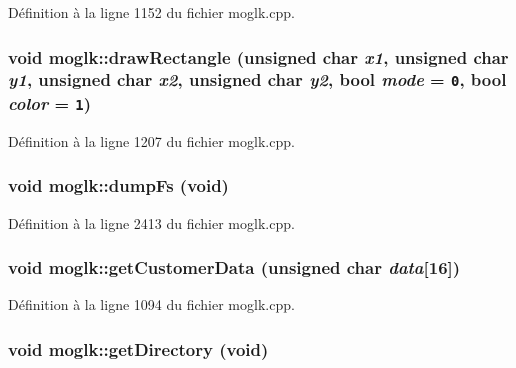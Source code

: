 Définition à la ligne 1152 du fichier moglk.cpp.\hypertarget{classmoglk_df18bd7ec24c35851bc72d6d09a99483}{
\subsubsection[{drawRectangle}]{\setlength{\rightskip}{0pt plus 5cm}void moglk::drawRectangle (unsigned char {\em x1}, \/  unsigned char {\em y1}, \/  unsigned char {\em x2}, \/  unsigned char {\em y2}, \/  bool {\em mode} = {\tt 0}, \/  bool {\em color} = {\tt 1})}}
\label{classmoglk_df18bd7ec24c35851bc72d6d09a99483}




Définition à la ligne 1207 du fichier moglk.cpp.\hypertarget{classmoglk_7f929ca25d08f1c116cd43152b7373f3}{
\subsubsection[{dumpFs}]{\setlength{\rightskip}{0pt plus 5cm}void moglk::dumpFs (void)}}
\label{classmoglk_7f929ca25d08f1c116cd43152b7373f3}




Définition à la ligne 2413 du fichier moglk.cpp.\hypertarget{classmoglk_75192d11f9a4e9abe2ba5b31c41ca772}{
\subsubsection[{getCustomerData}]{\setlength{\rightskip}{0pt plus 5cm}void moglk::getCustomerData (unsigned char {\em data}\mbox{[}16\mbox{]})}}
\label{classmoglk_75192d11f9a4e9abe2ba5b31c41ca772}




Définition à la ligne 1094 du fichier moglk.cpp.\hypertarget{classmoglk_06a6671f138121034a345e2cbd6497f8}{
\subsubsection[{getDirectory}]{\setlength{\rightskip}{0pt plus 5cm}void moglk::getDirectory (void)}}
\label{classmoglk_06a6671f138121034a345e2cbd6497f8}




